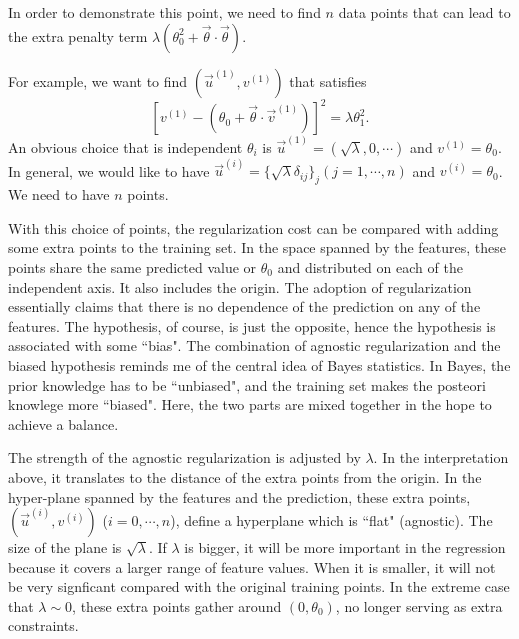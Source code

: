 In order to demonstrate this point, we need to find $n$ data points that can lead to the extra penalty term $\lambda(\theta_0^2+\vec\theta\cdot\vec\theta)$.

For example, we want to find $(\vec u^{(1)}, v^{(1)})$ that satisfies 
\begin{equation}
\left[v^{(1)} - \left(\theta_0 + \vec\theta\cdot\vec v^{(1)}\right)\right]^2 = \lambda\theta_1^2.
\end{equation}
An obvious choice that is independent $\theta_i$ is $\vec u^{(1)} = (\sqrt\lambda, 0, \cdots)$ and $v^{(1)} = \theta_0$.
In general, we would like to have $\vec u^{(i)} = \{\sqrt\lambda\delta_{ij}\}_j (j=1, \cdots, n)$ and $v^{(i)} = \theta_0$\footnotemark{}. We need to have $n$ points. 

With this choice of points, the regularization cost can be compared with adding some extra points to the training set. In the space spanned by 
the features, these points share the same predicted value or $\theta_0$ and distributed on each of the independent axis. It also includes the origin. The adoption 
of regularization essentially claims that there is no dependence of the prediction on any of the features. The hypothesis, of course, is just the opposite, hence
the hypothesis is associated with some ``bias". The combination of agnostic regularization and the biased hypothesis reminds me of the central idea of
Bayes statistics. In Bayes, the prior knowledge has to be ``unbiased", and the training set makes the posteori knowlege more ``biased". Here, the
two parts are mixed together in the hope to achieve a balance.

The strength of the agnostic regularization is adjusted by $\lambda$. In the interpretation above, it translates to the distance of the extra points 
from the origin. In the hyper-plane spanned by the features and the prediction, these extra points, $(\vec u^{(i)}, v^{(i)})$ ($i = 0, \cdots, n$), define a 
hyperplane which is ``flat" (agnostic). The size of the plane is $\sqrt\lambda$. If $\lambda$ is bigger, it will be more important in the regression because
it covers a larger range of feature values. When it is smaller, it will not be very signficant compared with the original training points. In the extreme
case that $\lambda\sim0$, these extra points gather around $(0, \theta_0)$, no longer serving as extra constraints.

